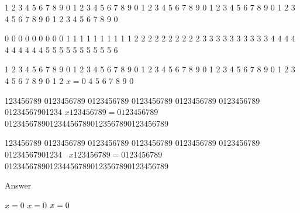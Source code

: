 1 2 3 4 5 6 7 8 9 0 1 2 3 4 5 6 7 8 9 0 1 2 3 4 5 6 7 8 9 0 1 2 3 4 5 6 7 8 9 0 1 2 3 4 5 6 7 8 9 0 1 2 3 4 5 6 7 8 9 0

0 0 0 0 0 0 0 0 0 1 1 1 1 1 1 1 1 1 1 2 2 2 2 2 2 2 2 2 2 3 3 3 3 3 3 3 3 3 3 4 4 4 4 4 4 4 4 4 4 5 5 5 5 5 5 5 5 5 5 6

1 2 3 4 5 6 7 8 9 0 1 2 3 4 5 6 7 8 9 0 1 2 3 4 5 6 7 8 9 0 1 2 3 4 5 6 7 8 9 0 1 2 3 4 5 6 7 8 9 0 1 2 
$x = 0$
4 5 6 7 8 9 0

123456789 0123456789 0123456789 0123456789 0123456789 0123456789 01234567901234
$x123456789 = 0123456789$
 0123456789012344567890123567890123456789

123456789 0123456789 0123456789 0123456789 0123456789 0123456789 01234567901234
\hbox{ $x123456789 = 0123456789$}
 0123456789012344567890123567890123456789

Answer

\hbox{$x=0$}
${x=0}$
$x=\nobreak0$

\bye

